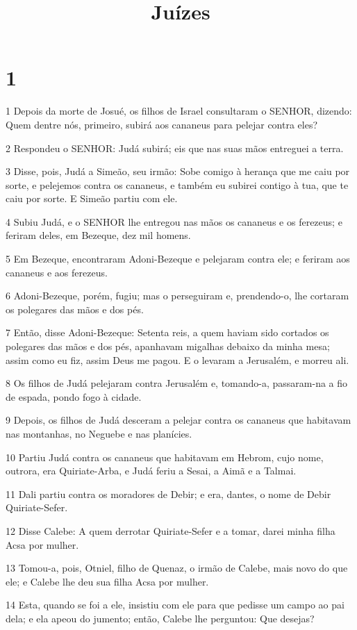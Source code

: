 

\title{Juízes}


\chapter{1}

\par 1 Depois da morte de Josué, os filhos de Israel consultaram o SENHOR, dizendo: Quem dentre nós, primeiro, subirá aos cananeus para pelejar contra eles?
\par 2 Respondeu o SENHOR: Judá subirá; eis que nas suas mãos entreguei a terra.
\par 3 Disse, pois, Judá a Simeão, seu irmão: Sobe comigo à herança que me caiu por sorte, e pelejemos contra os cananeus, e também eu subirei contigo à tua, que te caiu por sorte. E Simeão partiu com ele.
\par 4 Subiu Judá, e o SENHOR lhe entregou nas mãos os cananeus e os ferezeus; e feriram deles, em Bezeque, dez mil homens.
\par 5 Em Bezeque, encontraram Adoni-Bezeque e pelejaram contra ele; e feriram aos cananeus e aos ferezeus.
\par 6 Adoni-Bezeque, porém, fugiu; mas o perseguiram e, prendendo-o, lhe cortaram os polegares das mãos e dos pés.
\par 7 Então, disse Adoni-Bezeque: Setenta reis, a quem haviam sido cortados os polegares das mãos e dos pés, apanhavam migalhas debaixo da minha mesa; assim como eu fiz, assim Deus me pagou. E o levaram a Jerusalém, e morreu ali.
\par 8 Os filhos de Judá pelejaram contra Jerusalém e, tomando-a, passaram-na a fio de espada, pondo fogo à cidade.
\par 9 Depois, os filhos de Judá desceram a pelejar contra os cananeus que habitavam nas montanhas, no Neguebe e nas planícies.
\par 10 Partiu Judá contra os cananeus que habitavam em Hebrom, cujo nome, outrora, era Quiriate-Arba, e Judá feriu a Sesai, a Aimã e a Talmai.
\par 11 Dali partiu contra os moradores de Debir; e era, dantes, o nome de Debir Quiriate-Sefer.
\par 12 Disse Calebe: A quem derrotar Quiriate-Sefer e a tomar, darei minha filha Acsa por mulher.
\par 13 Tomou-a, pois, Otniel, filho de Quenaz, o irmão de Calebe, mais novo do que ele; e Calebe lhe deu sua filha Acsa por mulher.
\par 14 Esta, quando se foi a ele, insistiu com ele para que pedisse um campo ao pai dela; e ela apeou do jumento; então, Calebe lhe perguntou: Que desejas?
